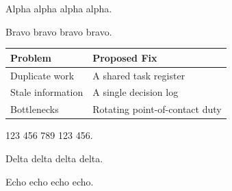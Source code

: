 \documentclass[12pt]{article}
\begin{document}
Alpha alpha alpha alpha.

Bravo bravo bravo bravo.

\begin{tabular}{|l|l|}
\hline
Problem & Proposed Fix \\
\hline
Duplicate work & A shared task register \\
Stale information & A single decision log \\
Bottlenecks & Rotating point-of-contact duty \\
\hline
\end{tabular}

123 456 789 123 456.

Delta delta delta delta.

Echo echo echo echo.
\end{document}
